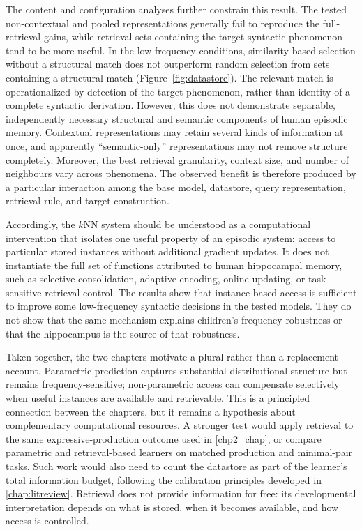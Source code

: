 The content and configuration analyses further constrain this result. The tested non-contextual and pooled representations generally fail to reproduce the full-retrieval gains, while retrieval sets containing the target syntactic phenomenon tend to be more useful. In the low-frequency conditions, similarity-based selection without a structural match does not outperform random selection from sets containing a structural match (Figure~\ref{fig:datastore}). The relevant match is operationalized by detection of the target phenomenon, rather than identity of a complete syntactic derivation. However, this does not demonstrate separable, independently necessary structural and semantic components of human episodic memory. Contextual representations may retain several kinds of information at once, and apparently ``semantic-only'' representations may not remove structure completely. Moreover, the best retrieval granularity, context size, and number of neighbours vary across phenomena. The observed benefit is therefore produced by a particular interaction among the base model, datastore, query representation, retrieval rule, and target construction.

Accordingly, the $k$NN system should be understood as a computational intervention that isolates one useful property of an episodic system: access to particular stored instances without additional gradient updates. It does not instantiate the full set of functions attributed to human hippocampal memory, such as selective consolidation, adaptive encoding, online updating, or task-sensitive retrieval control. The results show that instance-based access is sufficient to improve some low-frequency syntactic decisions in the tested models. They do not show that the same mechanism explains children's frequency robustness or that the hippocampus is the source of that robustness.

Taken together, the two chapters motivate a plural rather than a replacement account. Parametric prediction captures substantial distributional structure but remains frequency-sensitive; non-parametric access can compensate selectively when useful instances are available and retrievable. This is a principled connection between the chapters, but it remains a hypothesis about complementary computational resources. A stronger test would apply retrieval to the same expressive-production outcome used in \cref{chp2_chap}, or compare parametric and retrieval-based learners on matched production and minimal-pair tasks. Such work would also need to count the datastore as part of the learner's total information budget, following the calibration principles developed in \cref{chap:litreview}. Retrieval does not provide information for free: its developmental interpretation depends on what is stored, when it becomes available, and how access is controlled.

